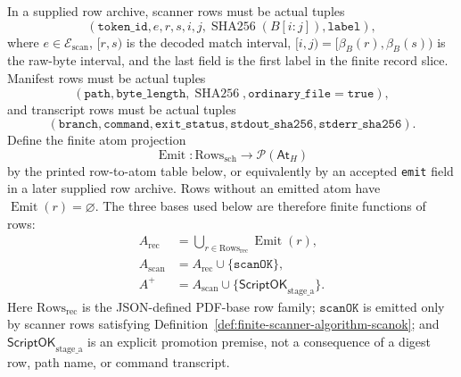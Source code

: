 \documentclass[runningheads]{llncs}
\newcommand{\ScriptOKstageA}{\mathsf{ScriptOK}_{\mathrm{stage\_a}}}
\newcommand{\AtH}{\mathsf{At}_{H}}
\begin{document}
In a supplied row archive, scanner rows must be actual tuples
\[
(\texttt{token\_id},e,r,s,i,j,\operatorname{SHA256}(B[i:j]),\texttt{label}),
\]
where \(e\in\mathcal E_{\mathrm{scan}}\), \([r,s)\) is the decoded match
interval, \([i,j)=[\beta_B(r),\beta_B(s))\) is the raw-byte interval, and the
last field is the first label in the finite record slice.  Manifest rows must be
actual tuples
\[
(\texttt{path},\texttt{byte\_length},\operatorname{SHA256},
\texttt{ordinary\_file}=\texttt{true}),
\]
and transcript rows must be actual tuples
\[
(\texttt{branch},\texttt{command},\texttt{exit\_status},
\texttt{stdout\_sha256},\texttt{stderr\_sha256}).
\]
Define the finite atom projection
\[
\operatorname{Emit}:\mathrm{Rows}_{\mathrm{sch}}\to\mathcal P(\AtH)
\]
by the printed row-to-atom table below, or equivalently by an accepted
\texttt{emit} field in a later supplied row archive.  Rows without an emitted
atom have \(\operatorname{Emit}(r)=\varnothing\).  The three bases used below are
therefore finite functions of rows:
\[
\begin{aligned}
A_{\mathrm{rec}}&=\bigcup_{r\in\mathrm{Rows}_{\mathrm{rec}}}
\operatorname{Emit}(r),\\
A_{\mathrm{scan}}&=A_{\mathrm{rec}}\cup\{\texttt{scanOK}\},\\
A^{+}&=A_{\mathrm{scan}}\cup\{\ScriptOKstageA\}.
\end{aligned}
\]
Here \(\mathrm{Rows}_{\mathrm{rec}}\) is the JSON-defined PDF-base row family;
\(\texttt{scanOK}\) is emitted only by scanner rows satisfying
Definition~\ref{def:finite-scanner-algorithm-scanok}; and \(\ScriptOKstageA\)
is an explicit promotion premise, not a consequence of a digest row, path name,
or command transcript.
\end{document}
